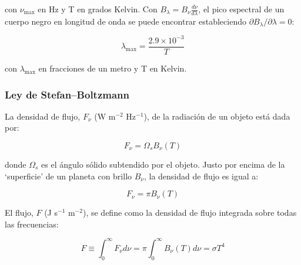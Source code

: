 \documentclass[12pt]{article}
\begin{document}
con $\nu_{\text{max}}$ en Hz y T en grados Kelvin. Con $B_\lambda = B_\nu \frac{d\nu}{d\lambda}$, el pico espectral 
de un cuerpo negro en longitud de onda se puede encontrar estableciendo $\partial B_\lambda / \partial \lambda = 0$:

\begin{equation}
    \lambda_{\text{max}} = \frac{2.9 \times 10^{-3}}{T}
    \label{eq:desplazamiento_wiens}
\end{equation}

con $\lambda_{\text{max}}$ en fracciones de un metro y T en Kelvin. \\

\subsubsection{Ley de Stefan–Boltzmann}
La densidad de flujo, $F_\nu$ (W m$^{-2}$ Hz$^{-1}$), de la radiación de un objeto está dada por:

\begin{equation}
F_\nu = \Omega_s B_\nu (T)
\end{equation}

donde $\Omega_s$ es el ángulo sólido subtendido por el objeto. Justo por encima de la ‘superficie’ de un planeta con 
brillo $B_\nu$, la densidad de flujo es igual a:

\begin{equation}
F_\nu = \pi B_\nu (T)
\end{equation}

El flujo, $F$ (J s$^{-1}$ m$^{-2}$), se define como la densidad de flujo integrada sobre todas las frecuencias:

\begin{equation}
    F \equiv \int_0^\infty F_\nu d\nu = \pi \int_0^\infty B_\nu (T) d\nu = \sigma T^4
    \label{eq:Stefan–Boltzmann}
\end{equation}
\end{document}
